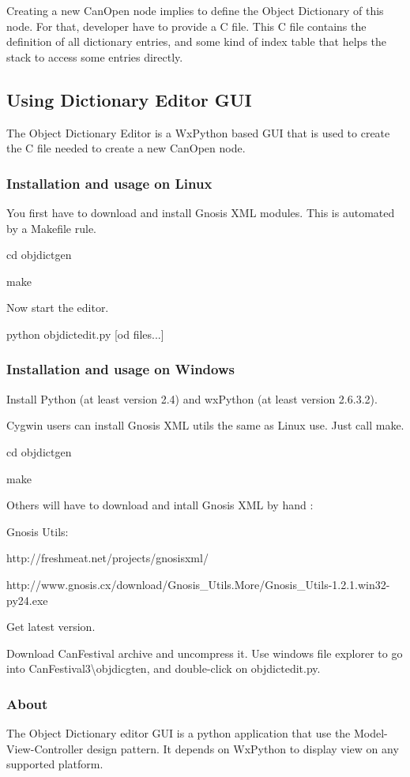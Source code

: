 \documentclass[12pt,twoside]{article}
\begin{document}
Creating a new CanOpen node implies to define the Object Dictionary of
this node. For that, developer have to provide a C file. This C file
contains the definition of all dictionary entries, and some kind of
index table that helps the stack to access some entries directly.

\subsection{Using Dictionary Editor GUI}
The Object Dictionary Editor is a WxPython based GUI that is used to
create the C file needed to create a new CanOpen node. 

\subsubsection{Installation and usage on Linux}
You first have to download and install Gnosis XML modules. This is
automated by a Makefile rule.

{\ttfamily
cd objdictgen}

{\ttfamily
make}

Now start the editor.

{\ttfamily
python objdictedit.py [od files...]}

\subsubsection{Installation and usage on Windows}
Install Python (at least version 2.4) and wxPython (at least version
2.6.3.2).

Cygwin users can install Gnosis XML utils the same as Linux use. Just
call make.

{\ttfamily
cd objdictgen}

{\ttfamily
make}

Others will have to download and intall Gnosis XML by hand :

{\ttfamily
Gnosis Utils:}

{\ttfamily
http://freshmeat.net/projects/gnosisxml/}

{\ttfamily
http://www.gnosis.cx/download/Gnosis\_Utils.More/Gnosis\_Utils{}-1.2.1.win32{}-py24.exe}

{\ttfamily
Get latest version.}

Download CanFestival archive and uncompress it. Use windows file
explorer to go into CanFestival3{\textbackslash}objdicgten, and
double{}-click on objdictedit.py.

\subsubsection{About}
The Object Dictionary editor GUI is a python application that use the
Model{}-View{}-Controller design pattern. It depends on WxPython to
display view on any supported platform.
\end{document}

